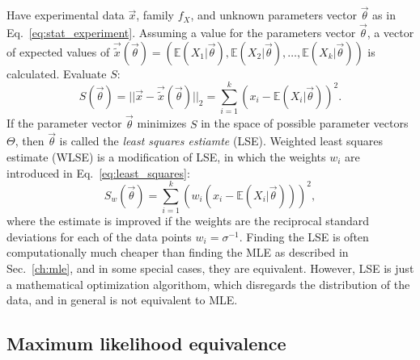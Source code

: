 Have experimental data $\vec{x}$, family $f_X$, and unknown parameters vector $\vec{\theta}$ as in Eq.~\ref{eq:stat_experiment}. Assuming a value for the parameters vector $\vec{{\theta}}$, a vector of expected values of $\vec{\tilde{x}}(\vec{{\theta}}) = (\mathbb{E}(X_1|\vec{\theta}),\mathbb{E}(X_2|\vec{\theta}),\dots,\mathbb{E}(X_k|\vec{\theta}))$ is calculated. Evaluate $S$:
\begin{equation}
    S(\vec{{\theta}}) = || \vec{x} - \vec{\tilde{x}}(\vec{{\theta}}) ||_2 = \sum_{i=1}^{k} \left( x_i - \mathbb{E}(X_i|\vec{\theta}) \right)^2. \label{eq:least_squares}
\end{equation}
If the parameter vector $\vec{{\theta}}$ minimizes $S$ in the space of possible parameter vectors $\Theta$, then $\vec{{\theta}}$ is called the \textit{least squares estiamte} (LSE). Weighted least squares estimate (WLSE) is a modification of LSE, in which the weights $w_i$ are introduced in Eq.~\ref{eq:least_squares}:
\begin{equation}
     S_w(\vec{{\theta}}) = \sum_{i=1}^{k} \left( w_i \left( x_i - \mathbb{E}(X_i|\vec{\theta}) \right) \right)^2, \label{eq:weighted_least_squares}
\end{equation}
where the estimate is improved if the weights are the reciprocal standard deviations for each of the data points $w_i = \sigma^{-1}$. Finding the LSE is often computationally much cheaper than finding the MLE as described in Sec.~\ref{ch:mle}, and in some special cases, they are equivalent. However, LSE is just a mathematical optimization algorithom, which disregards the distribution of the data, and in general is not equivalent to MLE. 

\subsection{Maximum likelihood equivalence}

